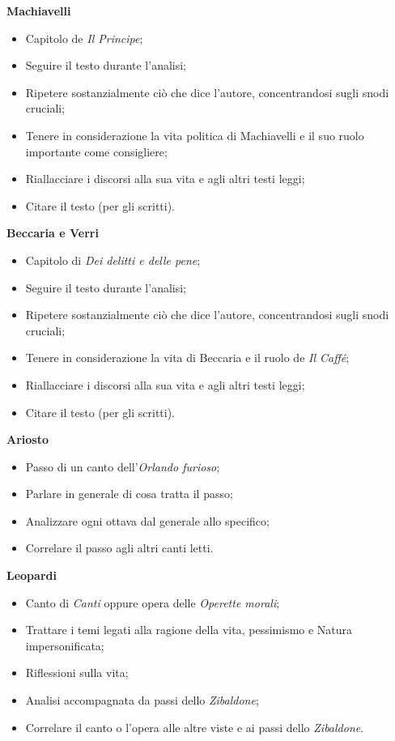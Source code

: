 \documentclass{article}
\begin{document}
\textbf{Machiavelli}
\begin{itemize}
    \item Capitolo de \textit{Il Principe};
    \item Seguire il testo durante l'analisi;
    \item Ripetere sostanzialmente ciò che dice l'autore, concentrandosi sugli snodi cruciali;
    \item Tenere in considerazione la vita politica di Machiavelli e il suo ruolo importante
        come consigliere;
    \item Riallacciare i discorsi alla sua vita e agli altri testi leggi;
    \item Citare il testo (per gli scritti).
\end{itemize}

\textbf{Beccaria e Verri}
\begin{itemize}
    \item Capitolo di \textit{Dei delitti e delle pene};
    \item Seguire il testo durante l'analisi;
    \item Ripetere sostanzialmente ciò che dice l'autore, concentrandosi sugli snodi cruciali;
    \item Tenere in considerazione la vita di Beccaria e il ruolo de \textit{Il Caffé};
    \item Riallacciare i discorsi alla sua vita e agli altri testi leggi;
    \item Citare il testo (per gli scritti).

\end{itemize}

\textbf{Ariosto}
\begin{itemize}
    \item Passo di un canto dell'\textit{Orlando furioso};
    \item Parlare in generale di cosa tratta il passo;
    \item Analizzare ogni ottava dal generale allo specifico;
    \item Correlare il passo agli altri canti letti.
\end{itemize}

\textbf{Leopardi}
\begin{itemize}
    \item Canto di \textit{Canti} oppure opera delle \textit{Operette morali};
    \item Trattare i temi legati alla ragione della vita, pessimismo e Natura impersonificata;
    \item Riflessioni sulla vita;
    \item Analisi accompagnata da passi dello \textit{Zibaldone};
    \item Correlare il canto o l'opera alle altre viste e ai passi dello \textit{Zibaldone}.
\end{itemize}
\end{document}
